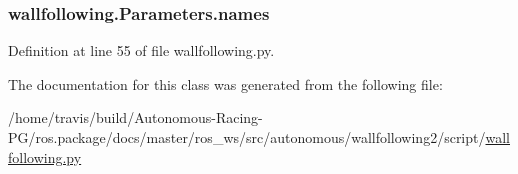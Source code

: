 \subsubsection[{\texorpdfstring{names}{names}}]{\setlength{\rightskip}{0pt plus 5cm}wallfollowing.\+Parameters.\+names}\hypertarget{classwallfollowing_1_1_parameters_a009e7e6821f14f92f657fae2a7315313}{}\label{classwallfollowing_1_1_parameters_a009e7e6821f14f92f657fae2a7315313}


Definition at line 55 of file wallfollowing.\+py.



The documentation for this class was generated from the following file\+:\begin{DoxyCompactItemize}
\item 
/home/travis/build/\+Autonomous-\/\+Racing-\/\+P\+G/ros.\+package/docs/master/ros\+\_\+ws/src/autonomous/wallfollowing2/script/\hyperlink{wallfollowing_8py}{wallfollowing.\+py}\end{DoxyCompactItemize}
